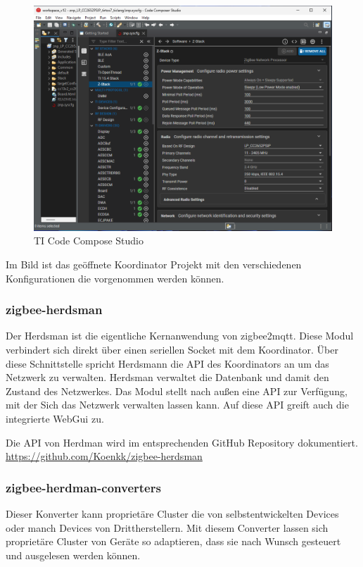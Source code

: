 \begin{figure}[H]
  \centering
  \includegraphics[width=1\textwidth]{media/cc-device.png}
  \caption{TI Code Compose Studio}
\end{figure}
Im Bild ist das geöffnete Koordinator Projekt mit den verschiedenen Konfigurationen die vorgenommen werden können.

\subsubsection{zigbee-herdsman}

Der Herdsman ist die eigentliche Kernanwendung von zigbee2mqtt. Diese Modul verbindert sich direkt über einen seriellen Socket mit dem Koordinator. Über diese Schnittstelle
spricht Herdsmann die API des Koordinators an um das Netzwerk zu verwalten. Herdsman verwaltet die Datenbank und damit den Zustand des Netzwerkes. Das Modul stellt nach außen
eine API zur Verfügung, mit der Sich das Netzwerk verwalten lassen kann. Auf diese API greift auch die integrierte WebGui zu.

Die API von Herdman wird im entsprechenden GitHub Repository dokumentiert.
\url{https://github.com/Koenkk/zigbee-herdsman}

\subsubsection{zigbee-herdman-converters}

Dieser Konverter kann proprietäre Cluster die von selbstentwickelten Devices oder manch Devices von Drittherstellern. Mit diesem Converter lassen sich proprietäre Cluster von Geräte
so adaptieren, dass sie nach Wunsch gesteuert und ausgelesen werden können.

